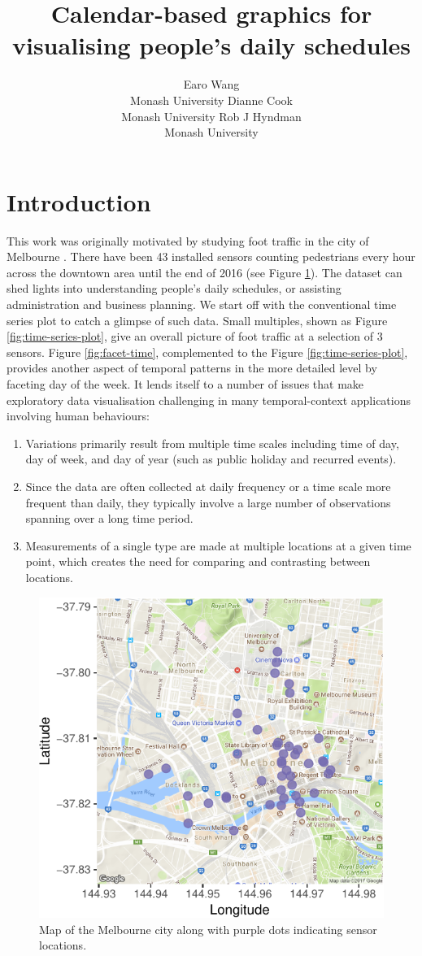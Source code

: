 \documentclass[article]{jss}
\author{
Earo Wang\\Monash University \And Dianne Cook\\Monash University \And Rob J Hyndman\\Monash University
}
\title{Calendar-based graphics for visualising people's daily schedules}
\providecommand{\tightlist}{%
  \setlength{\itemsep}{0pt}\setlength{\parskip}{0pt}}
\begin{document}
\section{Introduction}\label{introduction}

This work was originally motivated by studying foot traffic in the city
of Melbourne \citep{ped}. There have been 43 installed sensors counting
pedestrians every hour across the downtown area until the end of 2016
(see Figure \ref{fig:ped-map}). The dataset can shed lights into
understanding people's daily schedules, or assisting administration and
business planning. We start off with the conventional time series plot
to catch a glimpse of such data. Small multiples, shown as Figure
\ref{fig:time-series-plot}, give an overall picture of foot traffic at a
selection of 3 sensors. Figure \ref{fig:facet-time}, complemented to the
Figure \ref{fig:time-series-plot}, provides another aspect of temporal
patterns in the more detailed level by faceting day of the week. It
lends itself to a number of issues that make exploratory data
visualisation challenging in many temporal-context applications
involving human behaviours:

\begin{enumerate}
\def\labelenumi{\arabic{enumi}.}
\tightlist
\item
  Variations primarily result from multiple time scales including time
  of day, day of week, and day of year (such as public holiday and
  recurred events).
\item
  Since the data are often collected at daily frequency or a time scale
  more frequent than daily, they typically involve a large number of
  observations spanning over a long time period.
\item
  Measurements of a single type are made at multiple locations at a
  given time point, which creates the need for comparing and contrasting
  between locations.
\end{enumerate}

\begin{CodeChunk}
\begin{figure}

{\centering \includegraphics[width=0.55\linewidth]{figure/ped-map-1} 

}

\caption[Map of the Melbourne city along with purple dots indicating sensor locations]{Map of the Melbourne city along with purple dots indicating sensor locations.}\label{fig:ped-map}
\end{figure}
\end{CodeChunk}
\end{document}
